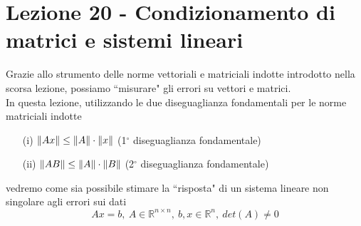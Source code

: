 \section{Lezione 20 - Condizionamento di matrici e sistemi lineari}

Grazie allo strumento delle norme vettoriali e matriciali indotte introdotto nella scorsa lezione, possiamo ``misurare" gli errori su vettori e matrici.\\
In questa lezione, utilizzando le due diseguaglianza fondamentali per le norme matriciali indotte
\begin{itemize}
    \item[(i)]$\lVert Ax\rVert \leq \lVert A\rVert\cdot\lVert x\rVert$ (1$^\circ$ diseguaglianza fondamentale)
    \item[(ii)] $\lVert AB\rVert \leq \lVert A\rVert \cdot\lVert B\rVert$ (2$^\circ$ diseguaglianza fondamentale)
\end{itemize}
vedremo come sia possibile stimare la ``risposta" di un sistema lineare non singolare agli errori sui dati
\begin{equation*}
    Ax=b, \ A\in \mathbb{R}^{n\times n}, \ b,x\in \mathbb{R}^n, \ det(A) \neq 0
\end{equation*}

